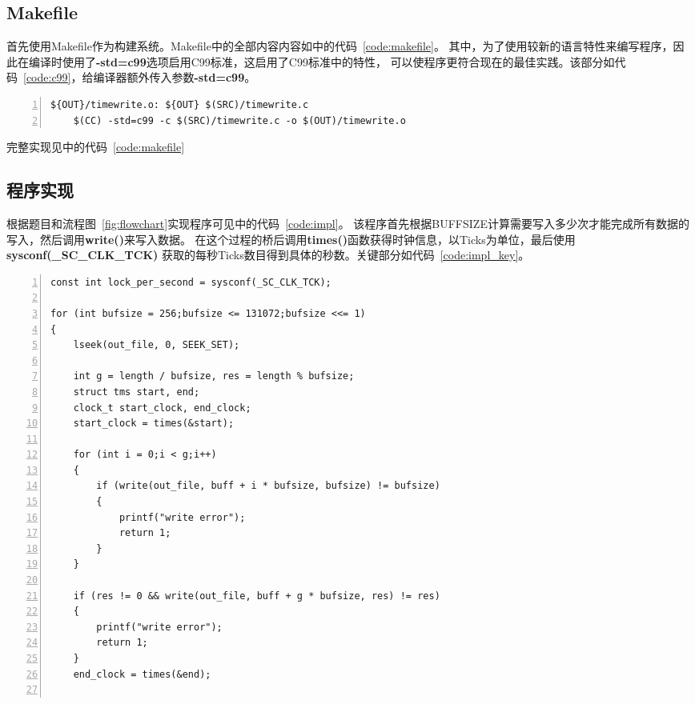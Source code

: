 \documentclass[a4paper,twoside]{article}
\begin{document}
\begin{spacing}{1.2}
\begin{figure}[htbp]
\begin{tikzpicture}[node distance=1cm]
	\end{tikzpicture}
\end{figure}

\subsection{Makefile}

首先使用Makefile作为构建系统。Makefile中的全部内容内容如中的代码~\ref{code:makefile}。
其中，为了使用较新的语言特性来编写程序，因此在编译时使用了\textbf{-std=c99}选项启用C99标准，这启用了C99标准中的特性，
可以使程序更符合现在的最佳实践。该部分如代码~\ref{code:c99}，给编译器额外传入参数\textbf{-std=c99}。

\begin{lstlisting}[numbers=left,style=MakefileStyle,caption=Makefile,label={code:c99}]
${OUT}/timewrite.o: ${OUT} $(SRC)/timewrite.c
	$(CC) -std=c99 -c $(SRC)/timewrite.c -o $(OUT)/timewrite.o
\end{lstlisting}

完整实现见中的代码~\ref{code:makefile}

\subsection{程序实现}

根据题目和流程图~\ref{fig:flowchart}实现程序可见\textbf{}中的代码~\ref{code:impl}。
该程序首先根据BUFFSIZE计算需要写入多少次才能完成所有数据的写入，然后调用\textbf{write()}来写入数据。
在这个过程的桥后调用\textbf{times()}函数获得时钟信息，以Ticks为单位，最后使用\textbf{sysconf(\_SC\_CLK\_TCK)}
获取的每秒Ticks数目得到具体的秒数。关键部分如代码~\ref{code:impl_key}。


\begin{lstlisting}[numbers=left,style=CppStyle,caption=程序关键部分,label={code:impl_key}]
const int lock_per_second = sysconf(_SC_CLK_TCK);

for (int bufsize = 256;bufsize <= 131072;bufsize <<= 1)
{
    lseek(out_file, 0, SEEK_SET);

    int g = length / bufsize, res = length % bufsize;
    struct tms start, end;
    clock_t start_clock, end_clock;
    start_clock = times(&start);
    
    for (int i = 0;i < g;i++)
    {
        if (write(out_file, buff + i * bufsize, bufsize) != bufsize)
        {
            printf("write error");
            return 1;
        }
    }

    if (res != 0 && write(out_file, buff + g * bufsize, res) != res)
    {
        printf("write error");
        return 1;
    }
    end_clock = times(&end);


\end{lstlisting}
\end{spacing}
\end{document}

